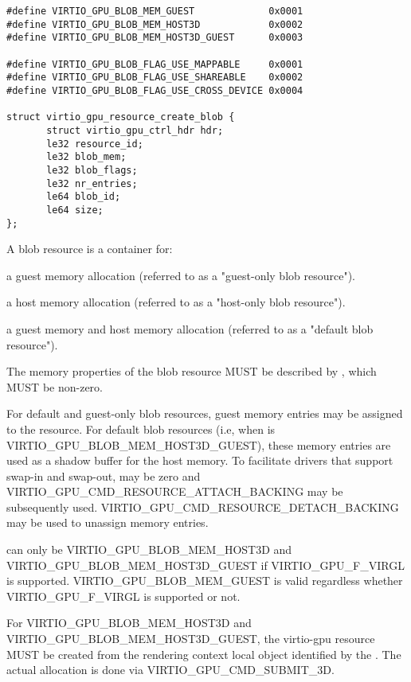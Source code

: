 \begin{description}
\begin{lstlisting}
#define VIRTIO_GPU_BLOB_MEM_GUEST             0x0001
#define VIRTIO_GPU_BLOB_MEM_HOST3D            0x0002
#define VIRTIO_GPU_BLOB_MEM_HOST3D_GUEST      0x0003

#define VIRTIO_GPU_BLOB_FLAG_USE_MAPPABLE     0x0001
#define VIRTIO_GPU_BLOB_FLAG_USE_SHAREABLE    0x0002
#define VIRTIO_GPU_BLOB_FLAG_USE_CROSS_DEVICE 0x0004

struct virtio_gpu_resource_create_blob {
       struct virtio_gpu_ctrl_hdr hdr;
       le32 resource_id;
       le32 blob_mem;
       le32 blob_flags;
       le32 nr_entries;
       le64 blob_id;
       le64 size;
};

\end{lstlisting}

A blob resource is a container for:

  \begin{itemize*}
  \item a guest memory allocation (referred to as a
  "guest-only blob resource").
  \item a host memory allocation (referred to as a
  "host-only blob resource").
  \item a guest memory and host memory allocation (referred
  to as a "default blob resource").
  \end{itemize*}

The memory properties of the blob resource MUST be described by
, which MUST be non-zero.

For default and guest-only blob resources,  guest
memory entries may be assigned to the resource.  For default blob resources
(i.e, when  is VIRTIO_GPU_BLOB_MEM_HOST3D_GUEST), these
memory entries are used as a shadow buffer for the host memory. To
facilitate drivers that support swap-in and swap-out,  may
be zero and VIRTIO_GPU_CMD_RESOURCE_ATTACH_BACKING may be subsequently used.
VIRTIO_GPU_CMD_RESOURCE_DETACH_BACKING may be used to unassign memory entries.

 can only be VIRTIO_GPU_BLOB_MEM_HOST3D and
VIRTIO_GPU_BLOB_MEM_HOST3D_GUEST if VIRTIO_GPU_F_VIRGL is supported.
VIRTIO_GPU_BLOB_MEM_GUEST is valid regardless whether VIRTIO_GPU_F_VIRGL
is supported or not.

For VIRTIO_GPU_BLOB_MEM_HOST3D and VIRTIO_GPU_BLOB_MEM_HOST3D_GUEST, the
virtio-gpu resource MUST be created from the rendering context local object
identified by the . The actual allocation is done via
VIRTIO_GPU_CMD_SUBMIT_3D.


\end{description}
